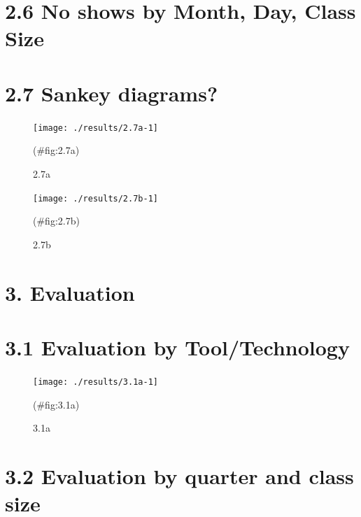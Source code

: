 \documentclass[
]{article}
\begin{document}
\hypertarget{no-shows-by-month-day-class-size}{%
\section{2.6 No shows by Month, Day, Class Size}\label{no-shows-by-month-day-class-size}}

\hypertarget{sankey-diagrams}{%
\section{2.7 Sankey diagrams?}\label{sankey-diagrams}}

\begin{figure}[H]

{\centering \texttt{[image: ./results/2.7a-1]} 

}

\caption{2.7a}(\#fig:2.7a)
\end{figure}

\begin{figure}[H]

{\centering \texttt{[image: ./results/2.7b-1]} 

}

\caption{2.7b}(\#fig:2.7b)
\end{figure}

\hypertarget{evaluation}{%
\section{3. Evaluation}\label{evaluation}}

\hypertarget{evaluation-by-tooltechnology}{%
\section{3.1 Evaluation by Tool/Technology}\label{evaluation-by-tooltechnology}}

\begin{figure}[H]

{\centering \texttt{[image: ./results/3.1a-1]} 

}

\caption{3.1a}(\#fig:3.1a)
\end{figure}

\hypertarget{evaluation-by-quarter-and-class-size}{%
\section{3.2 Evaluation by quarter and class size}\label{evaluation-by-quarter-and-class-size}}
\end{document}
